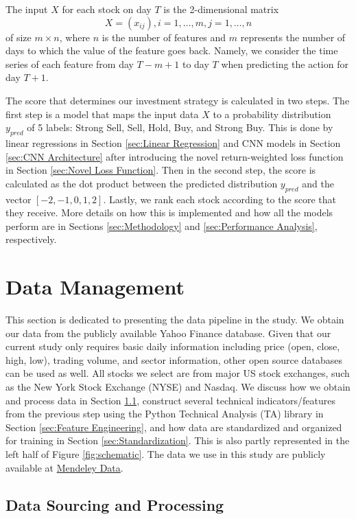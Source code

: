 \documentclass[preprint,12pt,numafflabel,authoryear]{elsarticle}
\begin{document}
The input $X$ for each stock on day $T$ is the 2-dimensional matrix
\[
X = (x_{ij}), i=1,\dots, m, j=1,\dots,n
\]
of size $m\times n$, where $n$ is the number of features and $m$ represents the number of days to which the value of the feature goes back. Namely, we consider the time series of each feature from day $T-m+1$ to day $T$ when predicting the action for day $T+1$.

The score that determines our investment strategy is calculated in two steps. The first step is a model that maps the input data $X$ to a probability distribution $y_{pred}$ of 5 labels: Strong Sell, Sell, Hold, Buy, and Strong Buy. This is done by linear regressions in Section \ref{sec:Linear Regression} and CNN models in Section \ref{sec:CNN Architecture} after introducing the novel return-weighted loss function in Section \ref{sec:Novel Loss Function}. Then in the second step, the score is calculated as the dot product between the predicted distribution $y_{pred}$ and the vector $[-2,-1,0,1,2]$. Lastly, we rank each stock according to the score that they receive. More details on how this is implemented and how all the models perform are in Sections \ref{sec:Methodology} and \ref{sec:Performance Analysis}, respectively.

\section{Data Management}
\label{sec:Data}

This section is dedicated to presenting the data pipeline in the study. We obtain our data from the publicly available Yahoo Finance database. Given that our current study only requires basic daily information including price (open, close, high, low), trading volume, and sector information, other open source databases can be used as well. All stocks we select are from major US stock exchanges, such as the New York Stock Exchange (NYSE) and Nasdaq. We discuss how we obtain and process data in Section \ref{sec:Data Sourcing}, construct several technical indicators/features from the previous step using the Python Technical Analysis (TA) library \citep{TALib} in Section \ref{sec:Feature Engineering}, and how data are standardized and organized for training in Section \ref{sec:Standardization}. This is also partly represented in the left half of Figure \ref{fig:schematic}. The data we use in this study are publicly available at \href{https://data.mendeley.com/datasets/czwwfgcgz7/1}{Mendeley Data}.

\subsection{Data Sourcing and Processing}
\label{sec:Data Sourcing}
\end{document}
